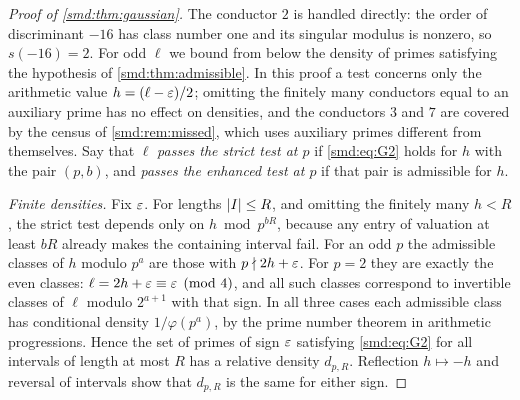 \begin{proof}[Proof of \cref{smd:thm:gaussian}]
The conductor $2$ is handled directly: the order of discriminant $-16$ has class number one
and its singular modulus is nonzero, so $s(-16)=2$. For odd $\ell$ we bound from below the
density of primes satisfying the hypothesis of \cref{smd:thm:admissible}. In this proof a
test concerns only the arithmetic value $h=(\ell-\varepsilon)/2$; omitting the finitely many
conductors equal to an auxiliary prime has no effect on densities, and the conductors $3$
and $7$ are covered by the census of \cref{smd:rem:missed}, which uses auxiliary primes
different from themselves. Say that $\ell$ \emph{passes the strict test at $p$} if
\eqref{smd:eq:G2} holds for $h$ with the pair $(p,b)$, and \emph{passes the enhanced test
at $p$} if that pair is admissible for $h$.

\emph{Finite densities.} Fix $\varepsilon$. For lengths $\lvert I\rvert\le R$, and omitting the finitely
many $h<R$, the strict test depends only on $h\bmod p^{bR}$, because any entry of valuation
at least $bR$ already makes the containing interval fail. For an odd $p$ the admissible
classes of $h$ modulo $p^a$ are those with $p\nmid2h+\varepsilon$. For $p=2$ they are exactly the
even classes: $\ell=2h+\varepsilon\equiv\varepsilon\pmod4$, and all such classes correspond to invertible
classes of $\ell$ modulo $2^{a+1}$ with that sign. In all three cases each admissible class
has conditional density $1/\varphi(p^a)$, by the prime number theorem in arithmetic
progressions. Hence the set of primes of sign $\varepsilon$ satisfying \eqref{smd:eq:G2} for all
intervals of length at most $R$ has a relative density $d_{p,R}$. Reflection $h\mapsto-h$
and reversal of intervals show that $d_{p,R}$ is the same for either sign.


\end{proof}
